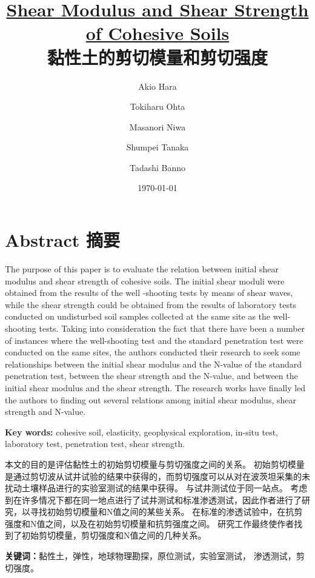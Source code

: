 \documentclass{myarticle}
\title{\textbf{\href{http://dx.doi.org/10.3208/sandf1972.14.3_1}{Shear Modulus and Shear Strength of Cohesive Soils}\\黏性土的剪切模量和剪切强度}}
\date{\today}
\author{Akio Hara \and Tokiharu Ohta \and Masanori Niwa \and Shumpei Tanaka \and Tadashi Banno}
\begin{document}
\maketitle

\section*{Abstract 摘要}

\begin{paracol}{2}

    The purpose of this paper is to evaluate the relation between initial shear modulus and shear strength of cohesive soils. The initial shear moduli were obtained from the results of the well -shooting tests by means of shear waves, while the shear strength could be obtained from the results of laboratory tests conducted on undisturbed soil samples collected at the same site as the well-shooting tests. Taking into consideration the fact that there have been a number of instances where the well-shooting test and the standard penetration test were conducted on the same sites, the authors conducted their research to seek some relationships between the initial shear modulus and the N-value of the standard penetration test, between the shear strength and the N-value, and between the initial shear modulus and the shear strength. The research works have finally led the authors to finding out several relations among initial shear modulus, shear strength and N-value.

    \textbf{Key words: }cohesive soil, elasticity, geophysical exploration, in-situ test, laboratory test, penetration test, shear strength.

    \switchcolumn

    本文的目的是评估黏性土的初始剪切模量与剪切强度之间的关系。 初始剪切模量是通过剪切波从试井试验的结果中获得的，而剪切强度可以从对在波茨坦采集的未扰动土壤样品进行的实验室测试的结果中获得。 与试井测试位于同一站点。 考虑到在许多情况下都在同一地点进行了试井测试和标准渗透测试，因此作者进行了研究，以寻找初始剪切模量和N值之间的某些关系。 在标准的渗透试验中，在抗剪强度和N值之间，以及在初始剪切模量和抗剪强度之间。 研究工作最终使作者找到了初始剪切模量，剪切强度和N值之间的几种关系。

    \textbf{关键词：}黏性土，弹性，地球物理勘探，原位测试，实验室测试， 渗透测试，剪切强度。

\end{paracol}












\end{document}

